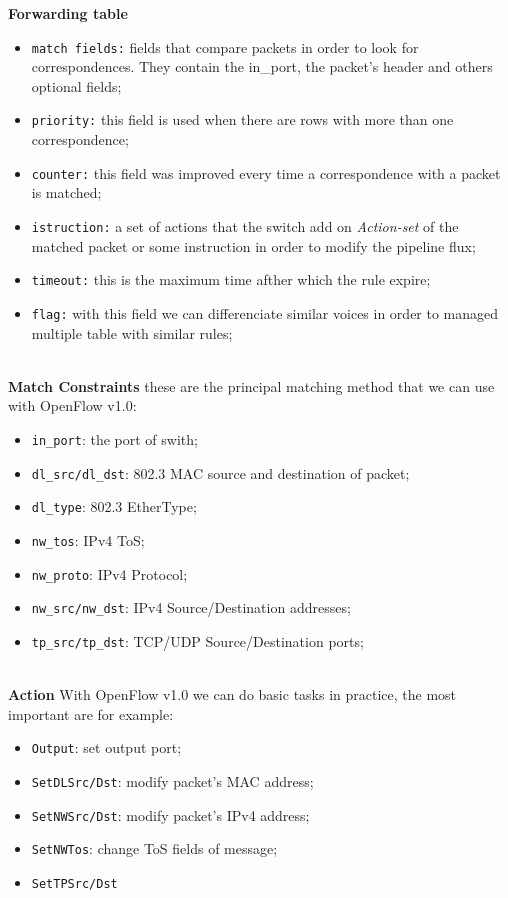 \documentclass[article,10pt]{IEEEtran}
\begin{document}
\textbf{Forwarding table}
\begin{itemize}
 \item \texttt{match fields:} fields that compare packets in order to look for correspondences. They contain the in_port, the packet's header and others optional fields;
 \item \texttt{priority:} this field is used when there are rows with more than one correspondence;
 \item \texttt{counter:} this field was improved every time a correspondence with a packet is matched;
 \item \texttt{istruction:} a set of actions that the switch add on \emph{Action-set} of the matched packet or some instruction 
 in order to modify the pipeline flux;
 \item \texttt{timeout:} this is the maximum time afther which the rule expire;
 \item \texttt{flag:} with this field we can differenciate similar voices in order to managed multiple table with similar rules;
 \\
 \\
\end{itemize}

\textbf{Match Constraints}
these are the principal matching method that we can use with OpenFlow v1.0:
\begin{itemize}
 \item \texttt{in_port}: the port of swith;
 \item \texttt{dl_src/dl_dst}: 802.3 MAC source and destination of packet;
 \item \texttt{dl_type}: 802.3 EtherType;
 \item \texttt{nw_tos}: IPv4 ToS;
 \item \texttt{nw_proto}: IPv4 Protocol;
 \item \texttt{nw_src/nw_dst}: IPv4 Source/Destination addresses;
 \item \texttt{tp_src/tp_dst}: TCP/UDP Source/Destination ports;
 \\
 \\
\end{itemize}

\textbf{Action} With OpenFlow v1.0 we can do basic tasks in practice, the most important are for example:
\begin{itemize}
 \item \texttt{Output}: set output port;
 \item \texttt{SetDLSrc/Dst}: modify packet's MAC address;
 \item \texttt{SetNWSrc/Dst}: modify packet's IPv4 address;
 \item \texttt{SetNWTos}: change ToS fields of message;
 \item \texttt{SetTPSrc/Dst}
\end{itemize}
\end{document}
